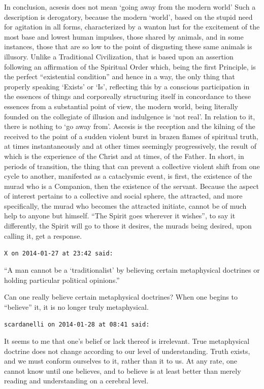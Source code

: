 \begin{footnotesize}
\begin{sffamily}
In conclusion, acsesis does not mean `going away from the modern world' Such a description is derogatory, because the modern `world', based on the stupid need for agitation in all forms, characterized by a wanton lust for the excitement of the most base and lowest human impulses, those shared by animals, and in some instances, those that are so low to the point of disgusting these same animals is illusory. Unlike a Traditional Civilization, that is based upon an assertion following an affirmation of the Spiritual Order which, being the first Principle, is the perfect ``existential condition'' and hence in a way, the only thing that properly speaking `Exists' or `Is', reflecting this by a conscious participation in the essences of things and corporeally structuring itself in concordance to these essences from a substantial point of view, the modern world, being literally founded on the collegiate of illusion and indulgence is `not real'. In relation to it, there is nothing to `go away from'. Ascesis is the reception and the kilning of the received to the point of a sudden violent burst in brazen flames of spiritual truth, at times instantaneously and at other times seemingly progressively, the result of which is the experience of the Christ and at times, of the Father. In short, in periods of transition, the thing that can prevent a collective violent shift from one cycle to another, manifested as a cataclysmic event, is first, the existence of the murad who is a Companion, then the existence of the servant. Because the aspect of interest pertains to a collective and social sphere, the attracted, and more specifically, the murad who becomes the attracted initiate, cannot be of much help to anyone but himself. ``The Spirit goes wherever it wishes'', to say it differently, the Spirit will go to those it desires, the murads being desired, upon calling it, get a response.

\hfill

\texttt{X on 2014-01-27 at 23:42 said:}

``A man cannot be a `traditionalist' by believing certain metaphysical doctrines or holding particular political opinions.''

Can one really believe certain metaphysical doctrines? When one begins to ``believe'' it, it is no longer truly metaphysical.

\hfill

\texttt{scardanelli on 2014-01-28 at 08:41 said:}

It seems to me that one's belief or lack thereof is irrelevant. True metaphysical doctrine does not change according to our level of understanding. Truth exists, and we must conform ourselves to it, rather than it to us. At any rate, one cannot know until one believes, and to believe is at least better than merely reading and understanding on a cerebral level.

\hfill


\end{sffamily}
\end{footnotesize}

